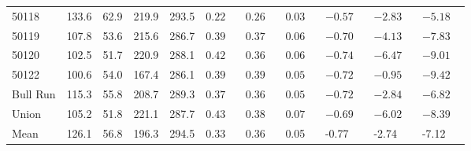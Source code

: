 \begin{tabular}{l p{1cm} p{1cm} p{1cm} p{1cm} p{1cm} p{1cm} p{1cm} p{1cm} p{1cm} p{1cm}}
50118 & 133.6 & 62.9 & 219.9 & 293.5 & $0.22\phantom{*}$ & $0.26\phantom{*}$ & $0.03\phantom{*}$ & $-0.57\phantom{*}$ & $-2.83\phantom{*}$ & $-5.18\phantom{*}$ \\
50119 & 107.8 & 53.6 & 215.6 & 286.7 & $0.39\phantom{*}$ & $0.37\phantom{*}$ & $0.06\phantom{*}$ & $-0.70\phantom{*}$ & $-4.13\phantom{*}$ & $-7.83\phantom{*}$ \\
50120 & 102.5 & 51.7 & 220.9 & 288.1 & $0.42\phantom{*}$ & $0.36\phantom{*}$ & $0.06\phantom{*}$ & $-0.74\phantom{*}$ & $-6.47\phantom{*}$ & $-9.01\phantom{*}$ \\
50122 & 100.6 & 54.0 & 167.4 & 286.1 & $0.39\phantom{*}$ & $0.39\phantom{*}$ & $0.05\phantom{*}$ & $-0.72\phantom{*}$ & $-0.95\phantom{*}$ & $-9.42\phantom{*}$ \\
Bull Run & 115.3 & 55.8 & 208.7 & 289.3 & $0.37\phantom{*}$ & $0.36\phantom{*}$ & $0.05\phantom{*}$ & $-0.72\phantom{*}$ & $-2.84\phantom{*}$ & $-6.82\phantom{*}$ \\
Union & 105.2 & 51.8 & 221.1 & 287.7 & $0.43\phantom{*}$ & $0.38\phantom{*}$ & $0.07\phantom{*}$ & $-0.69\phantom{*}$ & $-6.02\phantom{*}$ & $-8.39\phantom{*}$ \\
\hline
Mean & 126.1 & 56.8 & 196.3 & 294.5 & 0.33 & 0.36 & 0.05 & -0.77 & -2.74 & -7.12 \\
\end{tabular}
